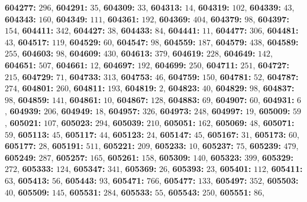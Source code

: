 \textsf{\bfseries 604277:} $296$, \textsf{\bfseries 604291:} $35$, \textsf{\bfseries 604309:} $33$, \textsf{\bfseries 604313:} $14$, \textsf{\bfseries 604319:} $102$, \textsf{\bfseries 604339:} $43$, \textsf{\bfseries 604343:} $160$, \textsf{\bfseries 604349:} $111$, \textsf{\bfseries 604361:} $192$, \textsf{\bfseries 604369:} $404$, \textsf{\bfseries 604379:} $98$, \textsf{\bfseries 604397:} $154$, \textsf{\bfseries 604411:} $342$, \textsf{\bfseries 604427:} $38$, \textsf{\bfseries 604433:} $84$, \textsf{\bfseries 604441:} $11$, \textsf{\bfseries 604477:} $306$, \textsf{\bfseries 604481:} $43$, \textsf{\bfseries 604517:} $119$, \textsf{\bfseries 604529:} $60$, \textsf{\bfseries 604547:} $98$, \textsf{\bfseries 604559:} $187$, \textsf{\bfseries 604579:} $438$, \textsf{\bfseries 604589:} $255$, \textsf{\bfseries 604603:} $98$, \textsf{\bfseries 604609:} $430$, \textsf{\bfseries 604613:} $379$, \textsf{\bfseries 604619:} $228$, \textsf{\bfseries 604649:} $142$, \textsf{\bfseries 604651:} $507$, \textsf{\bfseries 604661:} $12$, \textsf{\bfseries 604697:} $192$, \textsf{\bfseries 604699:} $250$, \textsf{\bfseries 604711:} $251$, \textsf{\bfseries 604727:} $215$, \textsf{\bfseries 604729:} $71$, \textsf{\bfseries 604733:} $313$, \textsf{\bfseries 604753:} $46$, \textsf{\bfseries 604759:} $150$, \textsf{\bfseries 604781:} $52$, \textsf{\bfseries 604787:} $274$, \textsf{\bfseries 604801:} $260$, \textsf{\bfseries 604811:} $193$, \textsf{\bfseries 604819:} $2$, \textsf{\bfseries 604823:} $40$, \textsf{\bfseries 604829:} $98$, \textsf{\bfseries 604837:} $98$, \textsf{\bfseries 604859:} $141$, \textsf{\bfseries 604861:} $10$, \textsf{\bfseries 604867:} $128$, \textsf{\bfseries 604883:} $69$, \textsf{\bfseries 604907:} $60$, \textsf{\bfseries 604931:} $6$, \textsf{\bfseries 604939:} $206$, \textsf{\bfseries 604949:} $18$, \textsf{\bfseries 604957:} $326$, \textsf{\bfseries 604973:} $248$, \textsf{\bfseries 604997:} $19$, \textsf{\bfseries 605009:} $59$, \textsf{\bfseries 605021:} $107$, \textsf{\bfseries 605023:} $294$, \textsf{\bfseries 605039:} $210$, \textsf{\bfseries 605051:} $162$, \textsf{\bfseries 605069:} $48$, \textsf{\bfseries 605071:} $59$, \textsf{\bfseries 605113:} $45$, \textsf{\bfseries 605117:} $44$, \textsf{\bfseries 605123:} $24$, \textsf{\bfseries 605147:} $45$, \textsf{\bfseries 605167:} $31$, \textsf{\bfseries 605173:} $60$, \textsf{\bfseries 605177:} $28$, \textsf{\bfseries 605191:} $511$, \textsf{\bfseries 605221:} $209$, \textsf{\bfseries 605233:} $10$, \textsf{\bfseries 605237:} $75$, \textsf{\bfseries 605239:} $479$, \textsf{\bfseries 605249:} $287$, \textsf{\bfseries 605257:} $165$, \textsf{\bfseries 605261:} $158$, \textsf{\bfseries 605309:} $140$, \textsf{\bfseries 605323:} $399$, \textsf{\bfseries 605329:} $272$, \textsf{\bfseries 605333:} $124$, \textsf{\bfseries 605347:} $341$, \textsf{\bfseries 605369:} $26$, \textsf{\bfseries 605393:} $23$, \textsf{\bfseries 605401:} $112$, \textsf{\bfseries 605411:} $63$, \textsf{\bfseries 605413:} $56$, \textsf{\bfseries 605443:} $93$, \textsf{\bfseries 605471:} $766$, \textsf{\bfseries 605477:} $133$, \textsf{\bfseries 605497:} $352$, \textsf{\bfseries 605503:} $40$, \textsf{\bfseries 605509:} $145$, \textsf{\bfseries 605531:} $284$, \textsf{\bfseries 605533:} $55$, \textsf{\bfseries 605543:} $250$, \textsf{\bfseries 605551:} $86$, 
